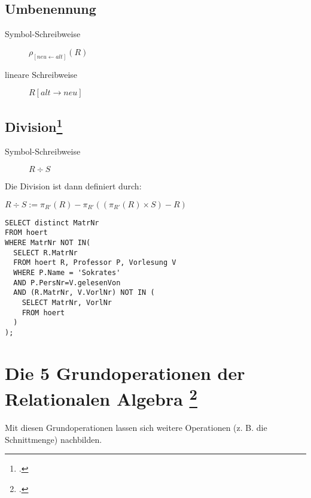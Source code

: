 \documentclass{lehramt-informatik}
\begin{document}
%

\subsection{Umbenennung}

\begin{description}
\item[Symbol-Schreibweise] $\rho_{[{neu}\leftarrow alt]} (R)$
\item[lineare Schreibweise] $R[alt\rightarrow neu]$
\end{description}

%

\subsection{Division\footcite[Division]{relationale-algebra}}

\begin{description}
\item[Symbol-Schreibweise] $R \div S$
\end{description}

Die Division ist dann definiert durch:

$R\div S:=\pi_{{R'}}(R)-\pi_{{R'}}((\pi_{{R'}}(R)\times S)-R)$

\begin{verbatim}
SELECT distinct MatrNr
FROM hoert
WHERE MatrNr NOT IN(
  SELECT R.MatrNr
  FROM hoert R, Professor P, Vorlesung V
  WHERE P.Name = 'Sokrates'
  AND P.PersNr=V.gelesenVon
  AND (R.MatrNr, V.VorlNr) NOT IN (
    SELECT MatrNr, VorlNr
    FROM hoert
  )
);
\end{verbatim}

%

\section{Die 5 Grundoperationen der Relationalen Algebra
\footcite{net:pdf:lmu:dbs}
}

Mit diesen Grundoperationen lassen sich weitere Operationen (z. B. die
Schnittmenge) nachbilden.
\end{document}
